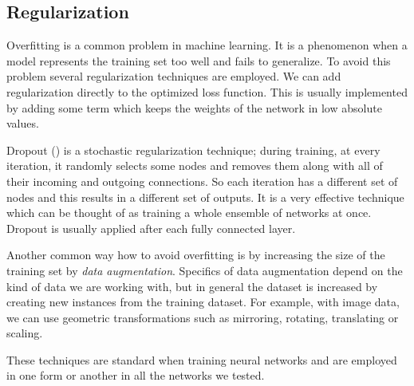 \subsection{Regularization}
\label{sec:regularization}
Overfitting is a common problem in machine learning. It is a phenomenon when a model represents the training set too well and fails to generalize. To avoid this problem several regularization techniques are employed. We can add regularization directly to the optimized loss function. This is usually implemented by adding some term which keeps the weights of the network in low absolute values. \par
Dropout (\cite{srivastava_dropout:_2014}) is a stochastic regularization technique; during training, at every iteration, it randomly selects some nodes and removes them along with all of their incoming and outgoing connections. So each iteration has a different set of nodes and this results in a different set of outputs. It is a very effective technique which can be thought of as training a whole ensemble of networks at once. Dropout is usually applied after each fully connected layer. \par
Another common way how to avoid overfitting is by increasing the size of the training set by \textit{data augmentation}. Specifics of data augmentation depend on the kind of data we are working with, but in general the dataset is increased by creating new instances from the training dataset. For example, with image data, we can use geometric transformations such as mirroring, rotating, translating or scaling. \par
These techniques are standard when training neural networks and are employed in one form or another in all the networks we tested.

